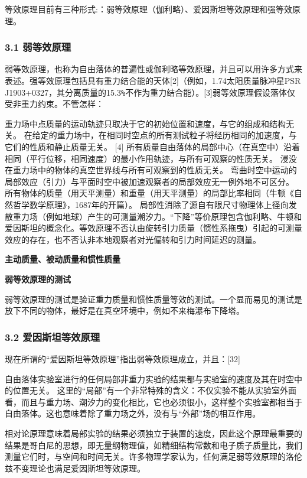 等效原理目前有三种形式:：弱等效原理（伽利略）、爱因斯坦等效原理和强等效原理。

\subsubsection{3.1 弱等效原理}
弱等效原理，也称为自由落体的普遍性或伽利略等效原理，并且可以用许多方式来表述。强等效原理包括具有重力结合能的天体[2]（例如，1.74太阳质量脉冲星PSR J1903+0327，其分离质量的15.3\verb|%|不作为重力结合能）。[3]弱等效原理假设落体仅受非重力约束。不管怎样：

重力场中点质量的运动轨迹只取决于它的初始位置和速度，与它的组成和结构无关。
在给定的重力场中，在相同时空点的所有测试粒子将经历相同的加速度，与它们的性质和静止质量无关。 [4]
所有质量自由落体的局部中心（在真空中）沿着相同（平行位移，相同速度）的最小作用轨迹，与所有可观察的性质无关。
浸没在重力场中的物体的真空世界线与所有可观察到的性质无关。
弯曲时空中运动的局部效应（引力）与平面时空中被加速观察者的局部效应无一例外地不可区分。
所有物体的质量（用天平测量）和重量（用天平测量）的局部比率相同（牛顿《自然哲学数学原理》，1687年的开篇）。
局部性消除了源自有限尺寸物理体上径向发散重力场（例如地球）产生的可测量潮汐力。“下降”等价原理包含伽利略、牛顿和爱因斯坦的概念化。等效原理不否认由旋转引力质量（惯性系拖曳）引起的可测量效应的存在，也不否认非本地观察者对光偏转和引力时间延迟的测量。

\textbf{主动质量、被动质量和惯性质量}

\textbf{弱等效原理的测试}

弱等效原理的测试是验证重力质量和惯性质量等效的测试。一个显而易见的测试是放下不同的物体，最好是在真空环境中，例如不来梅瀑布下降塔。





\subsubsection{3.2 爱因斯坦等效原理}

现在所谓的“爱因斯坦等效原理”指出弱等效原理成立，并且：[32]

自由落体实验室进行的任何局部非重力实验的结果都与实验室的速度及其在时空中的位置无关。
这里的“局部”有一个非常特殊的含义：不仅实验不能从实验室外面看，而且与重力场、潮汐力的变化相比，它也必须很小，这样整个实验室都相当于自由落体。这也意味着除了重力场之外，没有与“外部”场的相互作用。

相对论原理意味着局部实验的结果必须独立于装置的速度，因此这个原理最重要的结果是哥白尼的思想，即无量纲物理值，如精细结构常数和电子质子质量比，我们测量它们时，与空间和时间无关。许多物理学家认为，任何满足弱等效原理的洛伦兹不变理论也满足爱因斯坦等效原理。

